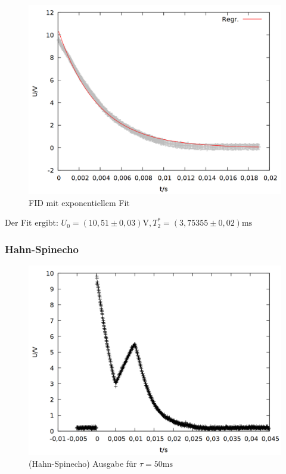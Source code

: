 \begin{figure}[h]
\centering
\includegraphics[width=0.75\linewidth]{data/p402_443_data/hahn_sequenz/out_fid.png}
\caption{FID mit exponentiellem Fit}
\label{fig:hahn_fid}
\end{figure}

Der Fit ergibt: $U_0 = (10,51\pm 0,03)\si{\volt}, T_2^* = (3,75355\pm 0,02) \si{\milli\second}$ 

\subsubsection{Hahn-Spinecho}
\begin{figure}[h]
\centering
\includegraphics[width=0.75\linewidth]{data/p402_443_data/hahn_sequenz/plot_146.png}
\caption{(Hahn-Spinecho) Ausgabe für $\tau = 50\si{\milli\second}$}
\label{fig:hahn_bsp}
\end{figure}


